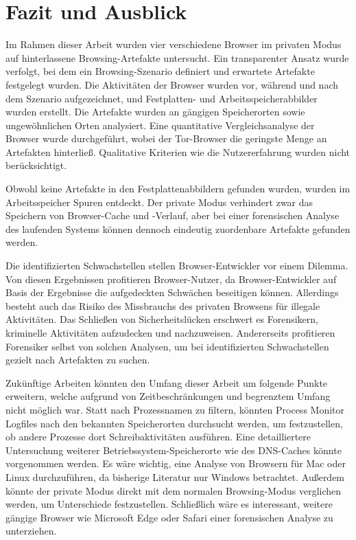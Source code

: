 \chapter{Fazit und Ausblick}\label{chap:Fazit-Ausblick}
\thispagestyle{plain.scrheadings}
\ohead{\headmark}


Im Rahmen dieser Arbeit wurden vier verschiedene Browser im privaten Modus auf hinterlassene Browsing-Artefakte untersucht. Ein transparenter Ansatz wurde verfolgt, bei dem ein Browsing-Szenario definiert und erwartete Artefakte festgelegt wurden. Die Aktivitäten der Browser wurden vor, während und nach dem Szenario aufgezeichnet, und Festplatten- und Arbeitsspeicherabbilder wurden erstellt. Die Artefakte wurden an gängigen Speicherorten sowie ungewöhnlichen Orten analysiert. Eine quantitative Vergleichsanalyse der Browser wurde durchgeführt, wobei der Tor-Browser die geringste Menge an Artefakten hinterließ. Qualitative Kriterien wie die Nutzererfahrung wurden nicht berücksichtigt.

Obwohl keine Artefakte in den Festplattenabbildern gefunden wurden, wurden im Arbeitsspeicher Spuren entdeckt. Der private Modus verhindert zwar das Speichern von Browser-Cache und -Verlauf, aber bei einer forensischen Analyse des laufenden Systems können dennoch eindeutig zuordenbare Artefakte gefunden werden.

Die identifizierten Schwachstellen stellen Browser-Entwickler vor einem Dilemma.
Von diesen Ergebnissen profitieren Browser-Nutzer, da Browser-Entwickler auf Basis der Ergebnisse die aufgedeckten Schwächen beseitigen können.
Allerdings besteht auch das Risiko des Missbrauchs des privaten Browsens für illegale Aktivitäten.
Das Schließen von Sicherheitslücken erschwert es Forensikern, kriminelle Aktivitäten aufzudecken und nachzuweisen. 
Andererseits profitieren Forensiker selbst von solchen Analysen, um bei identifizierten Schwachstellen gezielt nach Artefakten zu suchen. 

Zukünftige Arbeiten könnten den Umfang dieser Arbeit um folgende Punkte erweitern, welche aufgrund von Zeitbeschränkungen und begrenztem Umfang nicht möglich war. Statt nach Prozessnamen zu filtern, könnten Process Monitor Logfiles nach den bekannten Speicherorten durchsucht werden, um festzustellen, ob andere Prozesse dort Schreibaktivitäten ausführen. Eine detailliertere Untersuchung weiterer Betriebssystem-Speicherorte wie des DNS-Caches könnte vorgenommen werden. Es wäre wichtig, eine Analyse von Browsern für Mac oder Linux durchzuführen, da bisherige Literatur nur Windows betrachtet. Außerdem könnte der private Modus direkt mit dem normalen Browsing-Modus verglichen werden, um Unterschiede festzustellen. Schließlich wäre es interessant, weitere gängige Browser wie Microsoft Edge oder Safari einer forensischen Analyse zu unterziehen.

